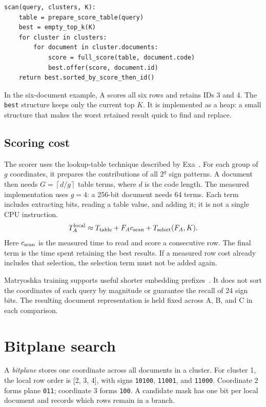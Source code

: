 \documentclass[11pt,a4paper]{article}
\newcommand{\ceil}[1]{\left\lceil #1\right\rceil}
\begin{document}
\begin{lstlisting}[caption={Method A: score every selected document.}]
scan(query, clusters, K):
    table = prepare_score_table(query)
    best = empty_top_k(K)
    for cluster in clusters:
        for document in cluster.documents:
            score = full_score(table, document.code)
            best.offer(score, document.id)
    return best.sorted_by_score_then_id()
\end{lstlisting}

In the six-document example, A scores all six rows and retains IDs 3 and 4. The
\texttt{best} structure keeps only the current top $K$. It is implemented as a heap: a
small structure that makes the worst retained result quick to find and replace.

\subsection{Scoring cost}
The scorer uses the lookup-table technique described by Exa~\cite{exa}. For each group of $g$
coordinates, it prepares the contributions of all $2^g$ sign patterns. A document then needs
$G=\ceil{d/g}$ table terms, where $d$ is the code length. The measured implementation uses
$g=4$: a 256-bit document needs 64 terms. Each term includes extracting bits, reading a table
value, and adding it; it is not a single CPU instruction.
\begin{equation}
 T_A^{\rm local}\approx T_{\rm table}+F_Ac_{\rm scan}+T_{\rm select}(F_A,K).
 \label{eq:a}
\end{equation}
Here $c_{\rm scan}$ is the measured time to read and score a consecutive row. The final term
is the time spent retaining the best results. If a measured row cost already includes that
selection, the selection term must not be added again.

Matryoshka training supports useful shorter embedding prefixes~\cite{exa,mrl}. It does not
sort the coordinates of each query by magnitude or guarantee the recall of 24 sign bits.
The resulting document representation is held fixed across A, B, and C in each comparison.

\newpage
\section{Bitplane search}
A \emph{bitplane} stores one coordinate across all documents in a cluster. For cluster 1,
the local row order is [2, 3, 4], with signs \texttt{10100}, \texttt{11001}, and
\texttt{11000}. Coordinate 2 forms plane \texttt{011}; coordinate 3 forms \texttt{100}.
A candidate mask has one bit per local document and records which rows remain in a branch.
\end{document}
